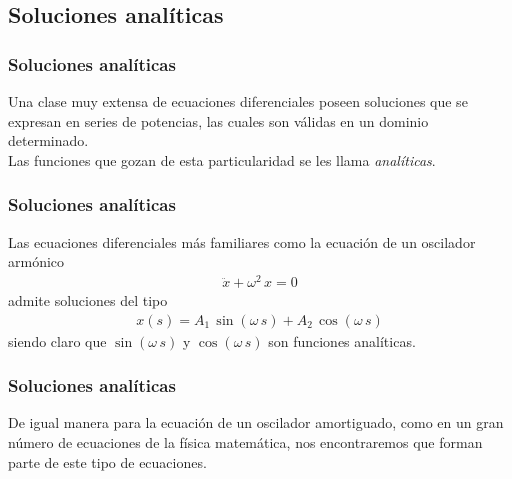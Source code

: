 \documentclass[12pt]{beamer}
\begin{document}
\subsection{Soluciones analíticas}
\begin{frame}
\frametitle{Soluciones analíticas}
Una clase muy extensa de ecuaciones diferenciales poseen soluciones que se expresan en series de potencias, las cuales son válidas en un dominio determinado.
\\
\bigskip
Las funciones que gozan de esta particularidad se les llama \emph{analíticas}.
\end{frame}
\begin{frame}
\frametitle{Soluciones analíticas}
 Las ecuaciones diferenciales más familiares como la ecuación de un oscilador armónico
 \begin{align*}
\ddot{x} + \omega^{2} \, x = 0
 \end{align*}
\pause
 admite soluciones del tipo
\begin{align*}
x(s) = A_{1} \, \sin( \omega \, s) + A_{2} \, \cos (\omega \, s)
\end{align*}
siendo claro que $\sin( \omega \, s)$ y $\cos( \omega \, s)$ son funciones analíticas.
\end{frame}
\begin{frame}
\frametitle{Soluciones analíticas}
De igual manera para la ecuación de un oscilador amortiguado, como en un gran número de ecuaciones de la física matemática, nos encontraremos que forman parte de este tipo de ecuaciones.
\end{frame}

\end{document}
